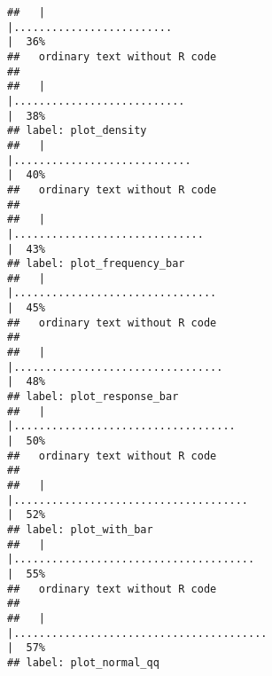 \documentclass[
]{article}
\begin{document}
\begin{verbatim}
##   |                                                                              |.........................                                             |  36%
##   ordinary text without R code
## 
##   |                                                                              |...........................                                           |  38%
## label: plot_density
##   |                                                                              |............................                                          |  40%
##   ordinary text without R code
## 
##   |                                                                              |..............................                                        |  43%
## label: plot_frequency_bar
##   |                                                                              |................................                                      |  45%
##   ordinary text without R code
## 
##   |                                                                              |.................................                                     |  48%
## label: plot_response_bar
##   |                                                                              |...................................                                   |  50%
##   ordinary text without R code
## 
##   |                                                                              |.....................................                                 |  52%
## label: plot_with_bar
##   |                                                                              |......................................                                |  55%
##   ordinary text without R code
## 
##   |                                                                              |........................................                              |  57%
## label: plot_normal_qq
\end{verbatim}
\end{document}
